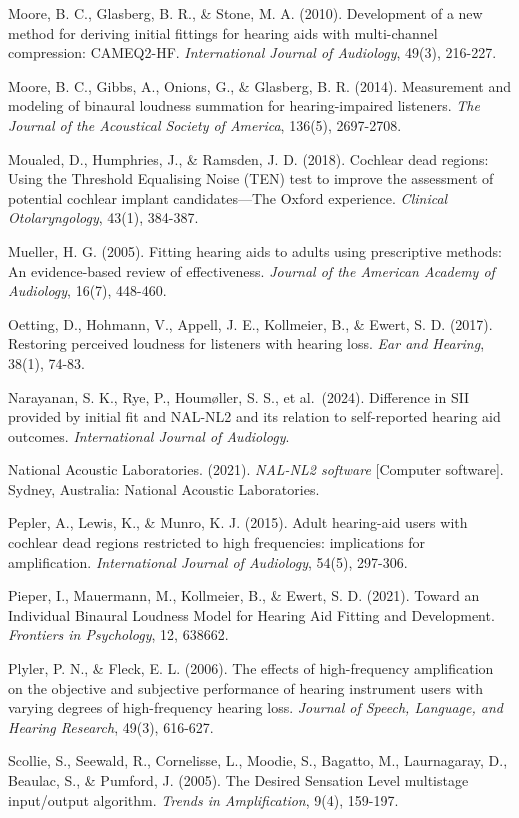 \documentclass[
  12pt,
]{article}
\begin{document}
Moore, B. C., Glasberg, B. R., \& Stone, M. A. (2010). Development of a
new method for deriving initial fittings for hearing aids with
multi-channel compression: CAMEQ2-HF. \emph{International Journal of
Audiology}, 49(3), 216-227.

Moore, B. C., Gibbs, A., Onions, G., \& Glasberg, B. R. (2014).
Measurement and modeling of binaural loudness summation for
hearing-impaired listeners. \emph{The Journal of the Acoustical Society
of America}, 136(5), 2697-2708.

Moualed, D., Humphries, J., \& Ramsden, J. D. (2018). Cochlear dead
regions: Using the Threshold Equalising Noise (TEN) test to improve the
assessment of potential cochlear implant candidates---The Oxford
experience. \emph{Clinical Otolaryngology}, 43(1), 384-387.

Mueller, H. G. (2005). Fitting hearing aids to adults using prescriptive
methods: An evidence-based review of effectiveness. \emph{Journal of the
American Academy of Audiology}, 16(7), 448-460.

Oetting, D., Hohmann, V., Appell, J. E., Kollmeier, B., \& Ewert, S. D.
(2017). Restoring perceived loudness for listeners with hearing loss.
\emph{Ear and Hearing}, 38(1), 74-83.

Narayanan, S. K., Rye, P., Houmøller, S. S., et al.~(2024). Difference
in SII provided by initial fit and NAL-NL2 and its relation to
self-reported hearing aid outcomes. \emph{International Journal of
Audiology}.

National Acoustic Laboratories. (2021). \emph{NAL-NL2 software}
{[}Computer software{]}. Sydney, Australia: National Acoustic
Laboratories.

Pepler, A., Lewis, K., \& Munro, K. J. (2015). Adult hearing-aid users
with cochlear dead regions restricted to high frequencies: implications
for amplification. \emph{International Journal of Audiology}, 54(5),
297-306.

Pieper, I., Mauermann, M., Kollmeier, B., \& Ewert, S. D. (2021). Toward
an Individual Binaural Loudness Model for Hearing Aid Fitting and
Development. \emph{Frontiers in Psychology}, 12, 638662.

Plyler, P. N., \& Fleck, E. L. (2006). The effects of high-frequency
amplification on the objective and subjective performance of hearing
instrument users with varying degrees of high-frequency hearing loss.
\emph{Journal of Speech, Language, and Hearing Research}, 49(3),
616-627.

Scollie, S., Seewald, R., Cornelisse, L., Moodie, S., Bagatto, M.,
Laurnagaray, D., Beaulac, S., \& Pumford, J. (2005). The Desired
Sensation Level multistage input/output algorithm. \emph{Trends in
Amplification}, 9(4), 159-197.
\end{document}
